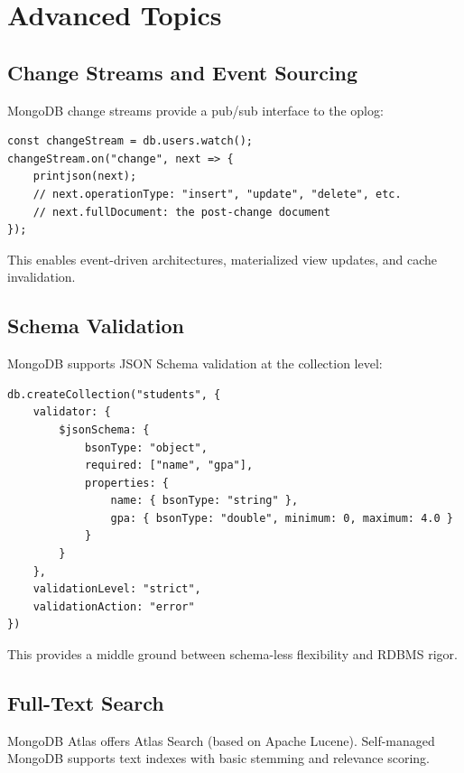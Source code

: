 \documentclass[12pt,a4paper]{article}
\begin{document}
\section{Advanced Topics}

\subsection{Change Streams and Event Sourcing}

MongoDB change streams provide a pub/sub interface to the oplog:

\begin{lstlisting}[language=MongoDB]
const changeStream = db.users.watch();
changeStream.on("change", next => {
    printjson(next);
    // next.operationType: "insert", "update", "delete", etc.
    // next.fullDocument: the post-change document
});
\end{lstlisting}

This enables event-driven architectures, materialized view updates, and cache invalidation.

\subsection{Schema Validation}

MongoDB supports JSON Schema validation at the collection level:

\begin{lstlisting}[language=MongoDB]
db.createCollection("students", {
    validator: {
        $jsonSchema: {
            bsonType: "object",
            required: ["name", "gpa"],
            properties: {
                name: { bsonType: "string" },
                gpa: { bsonType: "double", minimum: 0, maximum: 4.0 }
            }
        }
    },
    validationLevel: "strict",
    validationAction: "error"
})
\end{lstlisting}

This provides a middle ground between schema-less flexibility and RDBMS rigor.

\subsection{Full-Text Search}

MongoDB Atlas offers Atlas Search (based on Apache Lucene). Self-managed MongoDB supports text indexes with basic stemming and relevance scoring.
\end{document}
